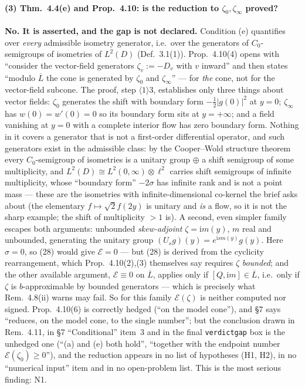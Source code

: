 \documentclass[11pt]{article}
\begin{document}
\paragraph{(3) Thm.~4.4(e) and Prop.~4.10: is the reduction to $\zeta_0,\zeta_\infty$
proved?}  \textbf{No.  It is asserted, and the gap is not declared.}  Condition (e)
quantifies over \emph{every} admissible isometry generator, i.e.\ over the generators of
$C_0$-semigroups of isometries of $L^2(D)$ (Def.~3.1(1)).  Prop.~4.10(4) opens with
``consider the vector-field generators $\zeta_v:=-D_v$ with $v$ inward'' and then states
``modulo $\overline L$ the cone is generated by $\zeta_0$ and $\zeta_\infty$'' --- for
\emph{the} cone, not for the vector-field subcone.  The proof, step $\langle1\rangle3$,
establishes only three things about vector fields: $\zeta_0$ generates the shift with
boundary form $-\frac12|g(0)|^2$ at $y=0$; $\zeta_\infty$ has $w(0)=w'(0)=0$ so its boundary
form sits at $y=+\infty$; and a field vanishing at $y=0$ with a complete interior flow has
zero boundary form.  Nothing in it covers a generator that is not a first-order
differential operator, and such generators exist in the admissible class: by the
Cooper--Wold structure theorem every $C_0$-semigroup of isometries is a unitary group
$\oplus$ a shift semigroup of some multiplicity, and $L^2(D)\cong L^2(0,\infty)\otimes
\ell^2$ carries shift semigroups of infinite multiplicity, whose ``boundary form''
$-2\sigma$ has infinite rank and is not a point mass --- these are the isometries with
infinite-dimensional co-kernel the brief asks about (the elementary $f\mapsto\sqrt2f(2y)$
is unitary and \emph{is} a flow, so it is not the sharp example; the shift of multiplicity
$>1$ is).  A second, even simpler family escapes both arguments: unbounded
\emph{skew-adjoint} $\zeta=\mathrm im(y)$, $m$ real and unbounded, generating the unitary
group $(U_sg)(y)=e^{\mathrm ism(y)}g(y)$.  Here $\sigma=0$, so (28) would give
$\mathcal E=0$ --- but (28) is derived from the cyclicity rearrangement, which
Prop.~4.10(2),(3) themselves say requires $\zeta$ \emph{bounded}; and the other available
argument, $\mathcal E\equiv0$ on $\overline L$, applies only if
$[Q,\mathrm im]\in\overline L$, i.e.\ only if $\zeta$ is $b$-approximable by bounded
generators --- which is precisely what Rem.~4.8(ii) warns may fail.  So for this family
$\mathcal E(\zeta)$ is neither computed nor signed.  Prop.~4.10(6) is correctly hedged
(``on the model cone''), and \S7 says ``reduces, on the model cone, to the single
number''; but the conclusion drawn in Rem.~4.11, in \S7 ``Conditional'' item~3 and in the
final \texttt{verdictgap} box is the unhedged one (``(a) and (e) both hold'', ``together
with the endpoint number $\mathcal E(\zeta_0)\ge0$''), and the reduction appears in no list
of hypotheses (H1, H2), in no ``numerical input'' item and in no open-problem list.  This is
the most serious finding: N1.
\end{document}
